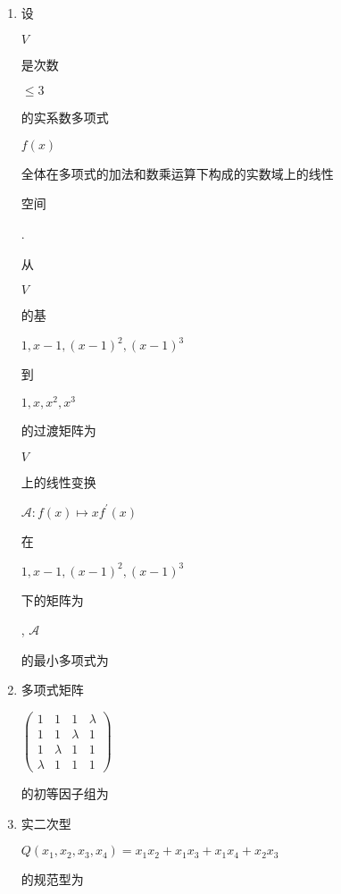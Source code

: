 \documentclass[10pt]{article}
\begin{document}
\begin{enumerate}
  \item \begin{CJK}{UTF8}{mj}设\end{CJK} $V$ \begin{CJK}{UTF8}{mj}是次数\end{CJK} $\leqslant 3$ \begin{CJK}{UTF8}{mj}的实系数多项式\end{CJK} $f(x)$ \begin{CJK}{UTF8}{mj}全体在多项式的加法和数乘运算下构成的实数域上的线性\end{CJK} \begin{CJK}{UTF8}{mj}空间\end{CJK}. \begin{CJK}{UTF8}{mj}从\end{CJK} $V$ \begin{CJK}{UTF8}{mj}的基\end{CJK} $1, x-1,(x-1)^{2},(x-1)^{3}$ \begin{CJK}{UTF8}{mj}到\end{CJK} $1, x, x^{2}, x^{3}$ \begin{CJK}{UTF8}{mj}的过渡矩阵为\end{CJK} $V$ \begin{CJK}{UTF8}{mj}上的线性变换\end{CJK} $\mathscr{A}: f(x) \mapsto x f^{\prime}(x)$ \begin{CJK}{UTF8}{mj}在\end{CJK} $1, x-1,(x-1)^{2},(x-1)^{3}$ \begin{CJK}{UTF8}{mj}下的矩阵为\end{CJK} , $\mathscr{A}$ \begin{CJK}{UTF8}{mj}的最小多项式为\end{CJK}

  \item \begin{CJK}{UTF8}{mj}多项式矩阵\end{CJK} $\left(\begin{array}{llll}1 & 1 & 1 & \lambda \\ 1 & 1 & \lambda & 1 \\ 1 & \lambda & 1 & 1 \\ \lambda & 1 & 1 & 1\end{array}\right)$ \begin{CJK}{UTF8}{mj}的初等因子组为\end{CJK}

  \item \begin{CJK}{UTF8}{mj}实二次型\end{CJK} $Q\left(x_{1}, x_{2}, x_{3}, x_{4}\right)=x_{1} x_{2}+x_{1} x_{3}+x_{1} x_{4}+x_{2} x_{3}$ \begin{CJK}{UTF8}{mj}的规范型为\end{CJK}

\end{enumerate}
\end{document}
